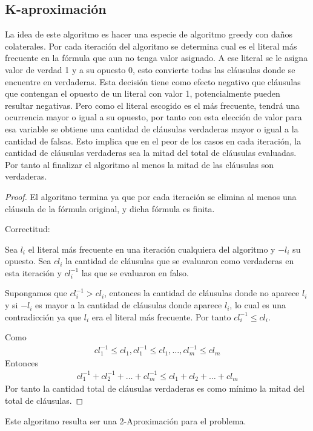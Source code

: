 \documentclass{article}
\begin{document}
    \subsection*{K-aproximación}
        
        La idea de este algoritmo es hacer una especie de algoritmo greedy con daños colaterales. 
        Por cada iteración del algoritmo se determina cual es el literal más frecuente en la fórmula que
        aun no tenga valor asignado. A ese literal se le asigna valor de verdad 1 y a su opuesto 0, esto convierte 
        todas las cláusulas donde se encuentre en verdaderas. Esta decisión tiene como efecto negativo 
        que cláusulas que contengan el opuesto de un literal con valor 1, potencialmente pueden resultar negativas.
        Pero como el literal escogido es el más frecuente, tendrá una ocurrencia mayor o igual a su opuesto, por tanto
        con esta elección de valor para esa variable se obtiene una cantidad de cláusulas verdaderas mayor o igual 
        a la cantidad de falsas. Esto implica que en el peor de los casos en cada iteración, la cantidad de cláusulas verdaderas
        sea la mitad del total de cláusulas evaluadas. Por tanto al finalizar el algoritmo
        al menos la mitad de las cláusulas son verdaderas.

        \begin{proof}
            El algoritmo termina ya que por cada iteración se elimina al menos una cláusula de la fórmula original, 
            y dicha fórmula es finita. 

            Correctitud:

            Sea $l_i$ el literal más frecuente en una iteración cualquiera del algoritmo y $-l_i$ su opuesto.
            Sea $cl_i$ la cantidad de cláusulas que se evaluaron como verdaderas en esta iteración y $cl_i^{-1}$ las que
            se evaluaron en falso. 
            
            Supongamos que $cl_i^{-1} > cl_i$, entonces la cantidad de cláusulas donde no aparece $l_i$ y si $-l_i$ 
            es mayor a la cantidad de cláusulas donde aparece $l_i$, lo cual es una contradicción ya que $l_i$ era el literal
            más frecuente. Por tanto $cl_i^{-1} \leq cl_i$.

            Como 
            \begin{align*}
                cl_1^{-1} \leq cl_1, cl_1^{-1} \leq cl_1, \dots, cl_m^{-1} \leq cl_m
            \end{align*}
            Entonces
            \begin{align*}
                cl_1^{-1} + cl_2^{-1} + \dots + cl_m^{-1} \leq cl_1 + cl_2 + \dots + cl_m
            \end{align*}
            Por tanto la cantidad total de cláusulas verdaderas es como mínimo la mitad del total de 
            cláusulas.
        \end{proof}
        Este algoritmo resulta ser una 2-Aproximación para el problema.
\end{document}
